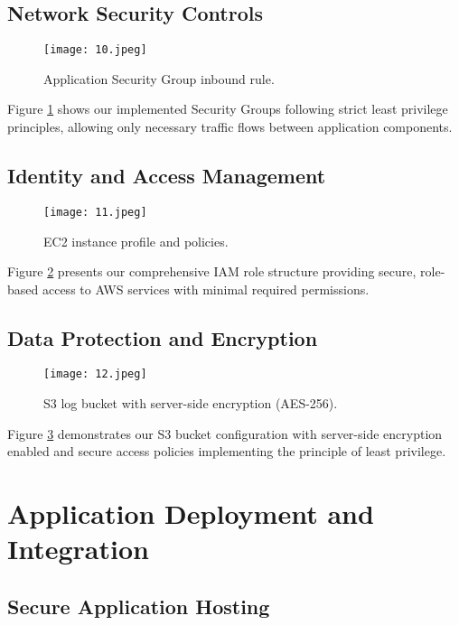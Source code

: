 \documentclass[12pt]{article}
\begin{document}
\subsection{Network Security Controls}

\begin{figure}[H]
\centering
\texttt{[image: 10.jpeg]}
\caption{Application Security Group inbound rule.}
\label{fig:security_groups}
\end{figure}

Figure \ref{fig:security_groups} shows our implemented Security Groups following strict least privilege principles, allowing only necessary traffic flows between application components.

\subsection{Identity and Access Management}

\begin{figure}[H]
\centering
\texttt{[image: 11.jpeg]}
\caption{EC2 instance profile and policies.}
\label{fig:iam_implementation}
\end{figure}

Figure \ref{fig:iam_implementation} presents our comprehensive IAM role structure providing secure, role-based access to AWS services with minimal required permissions.

\subsection{Data Protection and Encryption}

\begin{figure}[H]
\centering
\texttt{[image: 12.jpeg]}
\caption{S3 log bucket with server-side encryption (AES-256).}
\label{fig:s3_encryption}
\end{figure}

Figure \ref{fig:s3_encryption} demonstrates our S3 bucket configuration with server-side encryption enabled and secure access policies implementing the principle of least privilege.

\section{Application Deployment and Integration}

\subsection{Secure Application Hosting}
\end{document}
